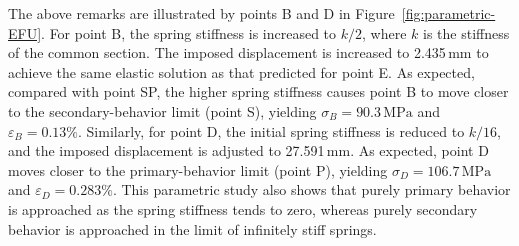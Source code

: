 \documentclass[10pt,a4paper]{article}
\begin{document}
The above remarks are illustrated by points B and D in Figure~\ref{fig:parametric-EFU}. For point B, the spring stiffness is increased to \(k/2\), where \(k\) is the stiffness of the common section. The imposed displacement is increased to 2.435\,mm to achieve the same elastic solution as that predicted for point E. As expected, compared with point SP, the higher spring stiffness causes point B to move closer to the secondary-behavior limit (point S), yielding \(\sigma_B = 90.3\,\text{MPa}\) and \(\varepsilon_B = 0.13\%\). Similarly, for point D, the initial spring stiffness is reduced to \(k/16\), and the imposed displacement is adjusted to 27.591\,mm. As expected, point D moves closer to the primary-behavior limit (point P), yielding \(\sigma_D = 106.7\,\text{MPa}\) and \(\varepsilon_D = 0.283\%\). This parametric study also shows that purely primary behavior is approached as the spring stiffness tends to zero, whereas purely secondary behavior is approached in the limit of infinitely stiff springs.
\end{document}
